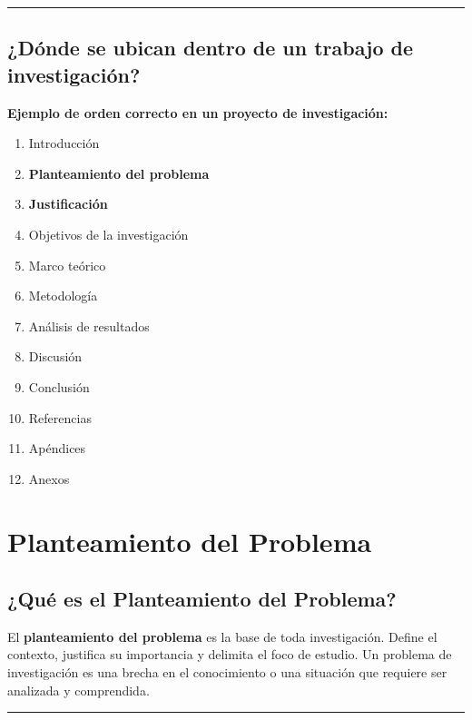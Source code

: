 \documentclass[
  letterpaper,
  DIV=11,
  numbers=noendperiod]{scrartcl}
\providecommand{\tightlist}{%
  \setlength{\itemsep}{0pt}\setlength{\parskip}{0pt}}
\begin{document}
\begin{center}\rule{0.5\linewidth}{0.5pt}\end{center}

\subsection{\texorpdfstring{\textbf{¿Dónde se ubican dentro de un
trabajo de
investigación?}}{¿Dónde se ubican dentro de un trabajo de investigación?}}\label{duxf3nde-se-ubican-dentro-de-un-trabajo-de-investigaciuxf3n}

\textbf{Ejemplo de orden correcto en un proyecto de investigación:}

\begin{enumerate}
\def\labelenumi{\arabic{enumi}.}
\tightlist
\item
  Introducción
\item
  \textbf{Planteamiento del problema}
\item
  \textbf{Justificación}
\item
  Objetivos de la investigación
\item
  Marco teórico
\item
  Metodología
\item
  Análisis de resultados
\item
  Discusión
\item
  Conclusión
\item
  Referencias
\item
  Apéndices
\item
  Anexos
\end{enumerate}

\section{Planteamiento del Problema}\label{planteamiento-del-problema}

\subsection{¿Qué es el Planteamiento del
Problema?}\label{quuxe9-es-el-planteamiento-del-problema}

El \textbf{planteamiento del problema} es la base de toda investigación.
Define el contexto, justifica su importancia y delimita el foco de
estudio. Un problema de investigación es una brecha en el conocimiento o
una situación que requiere ser analizada y comprendida.

\begin{center}\rule{0.5\linewidth}{0.5pt}\end{center}
\end{document}
